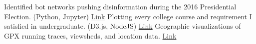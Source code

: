 	\begin{projects}
			{Identified bot networks pushing disinformation during the 2016 Presidential Election. (Python, Jupyter)}
			{\href{https://github.com/ryan-p-larson/polititweets}{Link}}
			{Plotting every college course and requirement I satisfied in undergraduate. (D3.js, NodeJS)}
			{\href{https://raw.githubusercontent.com/ryan-p-larson/ryan-p-larson/master/src/images/college.png}{Link}}
			{Geographic visualizations of GPX running traces, viewsheds, and location data.}
			{\href{https://github.com/ryan-p-larson/city-maps}{Link}}
	\end{projects}